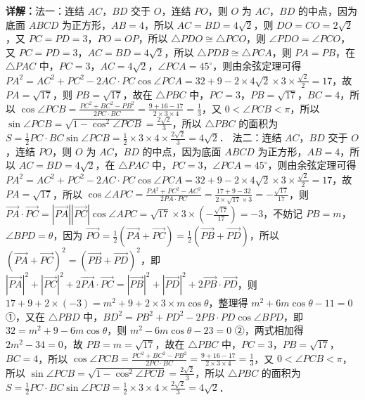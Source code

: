 \begin{question}[points=5]
\begin{solution}
\textbf{详解：}法一：连结 $AC$，$BD$ 交于 $O$，连结 $PO$，则 $O$ 为 $AC$，$BD$ 的中点，因为底面 $ABCD$ 为正方形，$AB=4$，所以 $AC=BD=4\sqrt{2}$，则 $DO=CO=2\sqrt{2}$，又 $PC=PD=3$，$PO=OP$，所以 $\triangle PDO \cong \triangle PCO$，则 $\angle PDO = \angle PCO$，又 $PC=PD=3$，$AC=BD=4\sqrt{2}$，所以 $\triangle PDB \cong \triangle PCA$，则 $PA=PB$，在 $\triangle PAC$ 中，$PC=3$，$AC=4\sqrt{2}$，$\angle PCA = 45^\circ$，则由余弦定理可得 $PA^2 = AC^2 + PC^2 - 2AC\cdot PC\cos\angle PCA = 32+9-2\times4\sqrt{2}\times3\times\frac{\sqrt{2}}{2}=17$，故 $PA=\sqrt{17}$，则 $PB=\sqrt{17}$，故在 $\triangle PBC$ 中，$PC=3$，$PB=\sqrt{17}$，$BC=4$，所以 $\cos\angle PCB = \frac{PC^2+BC^2-PB^2}{2PC\cdot BC} = \frac{9+16-17}{2\times3\times4} = \frac{1}{3}$，又 $0<\angle PCB<\pi$，所以 $\sin\angle PCB = \sqrt{1-\cos^2\angle PCB} = \frac{2\sqrt{2}}{3}$，所以 $\triangle PBC$ 的面积为 $S = \frac{1}{2} PC\cdot BC\sin\angle PCB = \frac{1}{2}\times3\times4\times\frac{2\sqrt{2}}{3} = 4\sqrt{2}$．
法二：连结 $AC$，$BD$ 交于 $O$，连结 $PO$，则 $O$ 为 $AC$，$BD$ 的中点，因为底面 $ABCD$ 为正方形，$AB=4$，所以 $AC=BD=4\sqrt{2}$，在 $\triangle PAC$ 中，$PC=3$，$\angle PCA = 45^\circ$，则由余弦定理可得 $PA^2 = AC^2+PC^2-2AC\cdot PC\cos\angle PCA = 32+9-2\times4\sqrt{2}\times3\times\frac{\sqrt{2}}{2}=17$，故 $PA=\sqrt{17}$，所以 $\cos\angle APC = \frac{PA^2+PC^2-AC^2}{2PA\cdot PC} = \frac{17+9-32}{2\times\sqrt{17}\times3} = -\frac{\sqrt{17}}{17}$，则 $\overrightarrow{PA}\cdot\overrightarrow{PC} = |\overrightarrow{PA}||\overrightarrow{PC}|\cos\angle APC = \sqrt{17}\times3\times\left(-\frac{\sqrt{17}}{17}\right) = -3$，不妨记 $PB=m$，$\angle BPD = \theta$，因为 $\overrightarrow{PO} = \frac{1}{2}(\overrightarrow{PA}+\overrightarrow{PC}) = \frac{1}{2}(\overrightarrow{PB}+\overrightarrow{PD})$，所以 $(\overrightarrow{PA}+\overrightarrow{PC})^2 = (\overrightarrow{PB}+\overrightarrow{PD})^2$，即 $|\overrightarrow{PA}|^2+|\overrightarrow{PC}|^2+2\overrightarrow{PA}\cdot\overrightarrow{PC} = |\overrightarrow{PB}|^2+|\overrightarrow{PD}|^2+2\overrightarrow{PB}\cdot\overrightarrow{PD}$，则 $17+9+2\times(-3) = m^2+9+2\times3\times m\cos\theta$，整理得 $m^2+6m\cos\theta-11=0$ ①，又在 $\triangle PBD$ 中，$BD^2 = PB^2+PD^2-2PB\cdot PD\cos\angle BPD$，即 $32 = m^2+9-6m\cos\theta$，则 $m^2-6m\cos\theta-23=0$ ②，两式相加得 $2m^2-34=0$，故 $PB=m=\sqrt{17}$，故在 $\triangle PBC$ 中，$PC=3$，$PB=\sqrt{17}$，$BC=4$，所以 $\cos\angle PCB = \frac{PC^2+BC^2-PB^2}{2PC\cdot BC} = \frac{9+16-17}{2\times3\times4} = \frac{1}{3}$，又 $0<\angle PCB<\pi$，所以 $\sin\angle PCB = \sqrt{1-\cos^2\angle PCB} = \frac{2\sqrt{2}}{3}$，所以 $\triangle PBC$ 的面积为 $S = \frac{1}{2} PC\cdot BC\sin\angle PCB = \frac{1}{2}\times3\times4\times\frac{2\sqrt{2}}{3} = 4\sqrt{2}$．
\end{solution}
\end{question}

